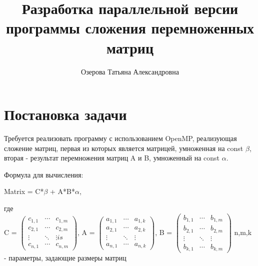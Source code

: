\documentclass[a4paper, 16pt]{extreport}
\title  {
	Разработка параллельной версии программы сложения перемноженных	матриц}
\author {Озерова Татьяна Александровна}
\begin{document}
	\maketitle
	\tableofcontents{}
	
 	\chapter*{Постановка задачи }
 	\makeatletter
 	\renewcommand\chapter{\par
 		\thispagestyle{plain}
 		\@afterindentfalse \secdef\@chapter\@schapter} 
 	Требуется реализовать программу с использованием OpenMP, реализующая сложение матриц, первая из которых является матрицей, умноженная на const $\beta$, вторая - результат перемножения матриц A и B, умноженный на const $\alpha$. 
 	
 	Формула  для вычисления:
 	
 	\centerline{Matrix = C*$\beta$ + A*B*$\alpha$,}
 	
 	 
 	 где \\ C = $\begin{pmatrix}
 		c_{1,1} & \cdots & c_{1,m} \\
 		c_{2,1} & \cdots & c_{2,m} \\
 		\vdots & \ddots & \vdots  is\\
 		c_{n,1} & \cdots & c_{n,m} 
 	\end{pmatrix}$,
 	A  = $\begin{pmatrix}
 		a_{1,1}  & \cdots & a_{1,k} \\
 		a_{2,1} & \cdots & a_{2,k} \\
 		\vdots  & \ddots & \vdots  \\
 		a_{n,1} & \cdots & a_{n,k} 
 	\end{pmatrix}$, 
 	B = $\begin{pmatrix}
 		b_{1,1}  & \cdots & b_{1,m} \\
 		b_{2,1} & \cdots & b_{2,m} \\
 		\vdots   & \ddots & \vdots  \\
 		b_{k,1} & \cdots & b_{k,m} 
 	\end{pmatrix}$  
    n,m,k - параметры, задающие размеры матриц 
\end{document}
